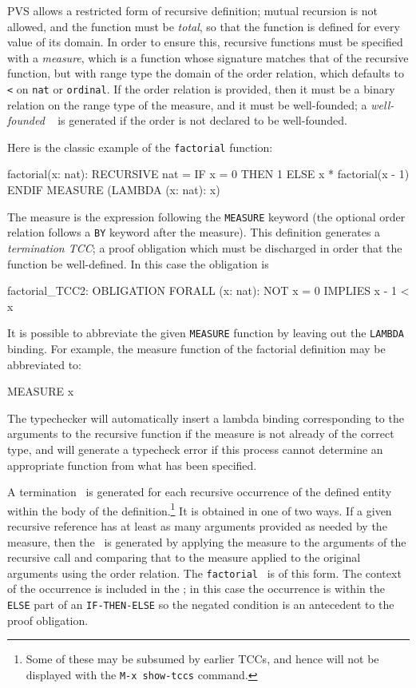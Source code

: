 PVS allows a restricted form of recursive definition; mutual
recursion is not allowed,
and the function must be \emph{total}, so that the
function is defined for every value of its domain.  In order to ensure
this, recursive functions must be specified with a
\emph{measure}, which is a function whose signature matches
that of the recursive function, but with range type the domain of the
order relation, which defaults to \texttt{<} on \texttt{nat} or
\texttt{ordinal}.  If the order
relation is provided, then it must be a binary relation on the range type
of the measure, and it must be well-founded; a \emph{well-founded} \tcc\
 is generated if the order
is not declared to be well-founded.

Here is the classic example of the
\texttt{factorial} function:
%
\begin{pvsex}
  factorial(x: nat): RECURSIVE nat =
    IF x = 0 THEN 1 ELSE x * factorial(x - 1) ENDIF
    MEASURE (LAMBDA (x: nat): x)
\end{pvsex}
%
The measure is the expression following the \texttt{MEASURE} keyword (the
optional order relation follows a \texttt{BY} keyword after the
measure).  This definition generates a \emph{termination
TCC}; a proof obligation
which must be discharged in order that the function be well-defined.  In
this case the obligation is
%
\begin{pvsex}
  factorial_TCC2: OBLIGATION
    FORALL (x: nat): NOT x = 0 IMPLIES x - 1 < x
\end{pvsex}

It is possible to abbreviate the given \texttt{MEASURE} function by
leaving out the \texttt{LAMBDA} binding.  For example, the measure
function of the factorial definition may be abbreviated to:
\begin{pvsex}
  MEASURE x
\end{pvsex}
The typechecker will automatically insert a lambda binding corresponding
to the arguments to the recursive function if the measure is not already
of the correct type, and will generate a typecheck error if this process
cannot determine an appropriate function from what has been specified.

A termination \tcc\ is generated for each recursive occurrence of the
defined entity within the body of the definition.\footnote{Some of these
may be subsumed by earlier TCCs, and hence will not be displayed with the
\texttt{M-x show-tccs} command.}  It is obtained in one of two ways.  If a
given recursive reference has at least as many arguments provided as
needed by the measure, then the \tcc\ is generated by applying the measure
to the arguments of the recursive call and comparing that to the measure
applied to the original arguments using the order relation.  The
\texttt{factorial} \tcc\ is of this form.  The context of the occurrence
is included in the \tcc; in this case the occurrence is within the
\texttt{ELSE} part of an \texttt{IF-THEN-ELSE} so the negated condition is
an antecedent to the proof obligation.

